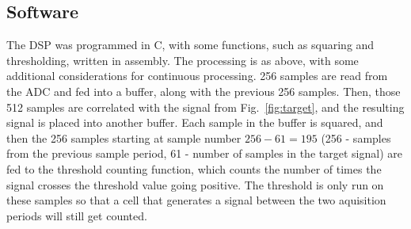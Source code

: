 \documentclass[10pt, journal]{IEEEtran}
\begin{document}
\subsection{Software}

The DSP was programmed in C, with some functions, such as squaring and
thresholding, written in assembly. The processing is as above, with
some additional considerations for continuous processing. 256 samples
are read from the ADC and fed into a buffer, along with the previous
256 samples. Then, those 512 samples are correlated with the signal
from Fig. \,\ref{fig:target}, and the resulting signal is placed into
another buffer. Each sample in the buffer is squared, and then the 256
samples starting at sample number $256-61=195$ (256 - samples from the
previous sample period, 61 - number of samples in the target signal)
are fed to the threshold counting function, which counts the number of
times the signal crosses the threshold value going positive. The
threshold is only run on these samples so that a cell that generates a
signal between the two aquisition periods will still get counted.

\newpage
 {}
\end{document}
